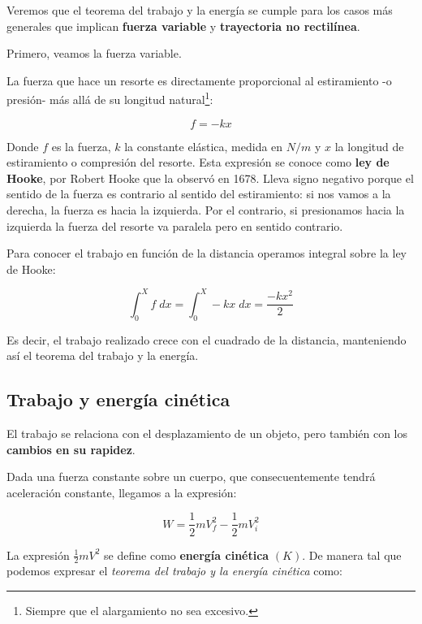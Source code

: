 Veremos que el teorema del trabajo y la energía se cumple para los casos más 
generales que implican \textbf{fuerza variable} y \textbf{trayectoria no rectilínea}.

Primero, veamos la fuerza variable.

La fuerza que hace un resorte es directamente proporcional al estiramiento
-o presión- más allá de su longitud natural\footnote{Siempre que el alargamiento no sea excesivo.}:

\begin{equation*}
    f = -kx
\end{equation*}

Donde \(f\) es la fuerza, \(k\) la constante elástica, medida en \(N/m\)
y \(x\) la longitud de estiramiento o compresión del resorte.
Esta expresión se conoce como \textbf{ley de Hooke}, por Robert Hooke que la 
observó en 1678.
Lleva signo negativo porque el sentido de la fuerza es contrario al sentido 
del estiramiento: si nos vamos a la derecha, la fuerza es hacia la izquierda.
Por el contrario, si presionamos hacia la izquierda la fuerza del resorte va 
paralela pero en sentido contrario.

Para conocer el trabajo en función de la distancia operamos integral sobre 
la ley de Hooke:

\begin{equation*}
    \int_{0}^{X} f \; dx = \int_{0}^{X} -kx \; dx = \frac{-kx^{2}}{2}
\end{equation*}

Es decir,
el trabajo realizado crece con el cuadrado de la distancia,
manteniendo así el teorema del trabajo y la energía.

\subsection{Trabajo y energía cinética}

El trabajo se relaciona con el desplazamiento de un objeto,
pero también con los \textbf{cambios en su rapidez}.

Dada una fuerza constante sobre un cuerpo,
que consecuentemente tendrá aceleración constante,
llegamos a la expresión:

\begin{equation*}
    W = \frac{1}{2}mV_f^{2} - \frac{1}{2}mV_i^{2} 
\end{equation*}

La expresión \(\frac{1}{2}mV^{2}\) se define como \textbf{energía cinética} \((K)\).
De manera tal que podemos expresar el 
\textit{teorema del trabajo y la energía cinética} como: 

